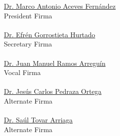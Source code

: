 \documentclass[letterpaper,12pt,openright,oneside]{article}
\begin{document}
\begin{titlepage}
\hspace{-.8cm} \underline{Dr. Marco Antonio Aceves Fernández}  \hspace{1.8cm}    \underline{  \qquad  \qquad \qquad \qquad }\\
President \hspace{7.8cm} Firma\\
\\
\underline{Dr. Efrén Gorrostieta Hurtado}  \hspace{2.99cm}     \underline{  \qquad  \qquad \qquad \qquad } \\
Secretary \hspace{7.8cm} Firma \\
\\
\underline{Dr. Juan Manuel Ramos Arreguín}\hspace{2.5cm}      \underline{ \qquad \qquad \qquad \qquad } \\
Vocal  \hspace{8.5cm} Firma \\
\\ 
\underline{Dr. Jesús Carlos Pedraza Ortega} \hspace{2.6cm} \underline{  \qquad  \qquad \qquad \qquad } \\
Alternate \hspace{7.8cm} Firma \\
\\
\underline{Dr. Saúl Tovar Arriaga} \hspace{4.3cm} \underline{  \qquad  \qquad \qquad \qquad } \\
Alternate \hspace{7.8cm} Firma \\

\thispagestyle{fancy}




\noindent
\begin{minipage}{0.8\textwidth}
\begin{flushleft} \large

\end{flushleft}
\end{minipage}%
\begin{minipage}{0.4\textwidth}
\begin{flushright} \large
\emph{ } \\

\end{flushright}
\end{minipage} 


\vfill



\end{titlepage}
\end{document}
